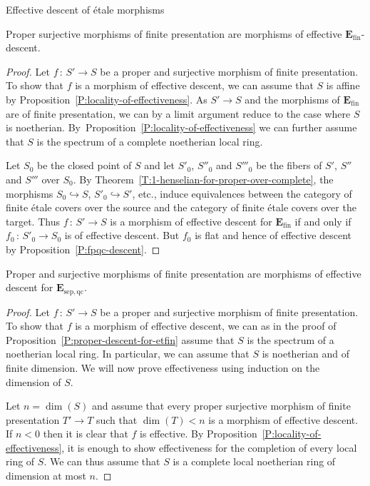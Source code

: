 \documentclass[a4paper,twoside,11pt]{amsart}[2009/07/02] %
\newcommand{\pref}[1]{\eqref{#1}}
\newcommand{\inj}{\hookrightarrow}
\newcommand{\map}[3]{#1\,:\, #2\rightarrow #3}
\newcommand{\etale}{\'{e}tale}
\newcommand{\sep}{\mathrm{sep}}
\newcommand{\catE}{\mathbf{E}}
\newcommand{\qc}{\mathrm{qc}}
\newcommand{\finite}{\mathrm{fin}}
\begin{document}
\begin{section}{Effective descent of \etale{} morphisms}
\begin{proposition}
\label{P:proper-descent-for-etfin}
Proper surjective morphisms of finite presentation are morphisms of
effective $\catE_{\finite}$-descent.
\end{proposition}
\begin{proof}
Let $\map{f}{S'}{S}$ be a proper and surjective morphism of finite
presentation. To show that $f$ is a morphism of effective descent, we can
assume that $S$ is affine by Proposition~\pref{P:locality-of-effectiveness}. As
$S'\to S$ and the morphisms of $\catE_{\finite}$ are of finite presentation, we
can by a limit argument reduce to the case where $S$ is
noetherian. By~Proposition~\pref{P:locality-of-effectiveness} we can further
assume that $S$ is the spectrum of a complete noetherian local ring.

Let $S_0$ be the closed point of $S$ and let $S'_0$, $S''_0$ and $S'''_0$ be
the fibers of $S'$, $S''$ and $S'''$ over $S_0$. By
Theorem~\pref{T:1-henselian-for-proper-over-complete}, the morphisms
$S_0\inj S$, $S'_0\inj S'$, etc., induce equivalences between the category
of finite \etale{} covers over the source and the category of finite
\etale{} covers over the target. Thus $\map{f}{S'}{S}$ is a morphism of
effective descent for $\catE_{\finite}$ if and only if $\map{f_0}{S'_0}{S_0}$
is of effective descent. But $f_0$ is flat and hence of effective
descent by Proposition~\pref{P:fpqc-descent}.
\end{proof}

\begin{corollary}\label{C:proper-descent-for-etsepqc}
Proper and surjective morphisms of finite presentation are morphisms of
effective descent for $\catE_{\sep,\qc}$.
\end{corollary}
\begin{proof}
Let $\map{f}{S'}{S}$ be a proper and surjective morphism of finite
presentation. To show that $f$ is a morphism of effective descent, we can as in
the proof of Proposition~\pref{P:proper-descent-for-etfin} assume that $S$ is
the spectrum of a noetherian local ring. In particular, we can assume that $S$
is noetherian and of finite dimension. We will now prove effectiveness using
induction on the dimension of $S$.

Let $n=\dim(S)$ and assume that every proper surjective morphism of finite
presentation $T'\to T$ such that $\dim(T)<n$ is a morphism of effective
descent. If $n<0$ then it is clear that $f$ is effective. 
By Proposition~\pref{P:locality-of-effectiveness}, it is enough to show
effectiveness for the completion of every local ring of $S$. We can thus
assume that $S$ is a complete local noetherian ring of dimension at most $n$.


\end{proof}
\end{section}
\end{document}
